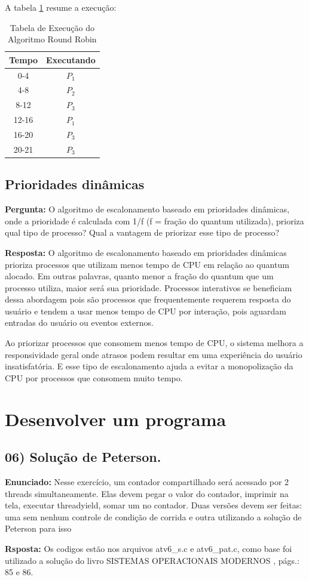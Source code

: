 \documentclass{article}
\begin{document}
A tabela \ref{tab:execRR} resume a execução:

\begin{table}[h]
    \centering
    \begin{tabular}{|c|c|}
        \hline
        \textbf{Tempo} & \textbf{Executando} \\
        \hline
        0-4   & \( P_1 \)  \\
        4-8   & \( P_2 \)  \\
        8-12  & \( P_3 \)  \\
        12-16 & \( P_1 \)  \\
        16-20 & \( P_3 \)  \\
        20-21 & \( P_3 \)  \\
        \hline
    \end{tabular}
    \caption{Tabela de Execução do Algoritmo Round Robin}
    \label{tab:execRR}
\end{table}

\subsection{Prioridades dinâmicas}
\textbf{Pergunta:} O algoritmo de escalonamento baseado em prioridades dinâmicas, onde a prioridade é calculada com 1/f (f = fração do quantum utilizada), prioriza qual tipo de processo? Qual a vantagem de priorizar esse tipo de processo?\newline

\textbf{Resposta:} O algoritmo de escalonamento baseado em prioridades dinâmicas prioriza processos que utilizam menos tempo de CPU em relação ao quantum alocado. Em outras palavras, quanto menor a fração do quantum que um processo utiliza, maior será sua prioridade. Processos interativos se beneficiam dessa abordagem pois são processos que frequentemente requerem resposta do usuário e tendem a usar menos tempo de CPU por interação, pois aguardam entradas do usuário ou eventos externos. 

Ao priorizar processos que consomem menos tempo de CPU, o sistema melhora a responsividade geral onde atrasos podem resultar em uma experiência do usuário insatisfatória. E esse tipo de escalonamento ajuda a evitar a monopolização da CPU por processos que consomem muito tempo. 

\section{Desenvolver um programa}
\subsection{06) Solução de Peterson.}
\textbf{Enunciado:} Nesse exercício, um contador compartilhado será acessado por 2 threads simultaneamente. Elas devem pegar o valor do contador, imprimir na tela, executar threadyield, somar um no contador. Duas versões devem ser feitas: uma sem nenhum controle de condição de corrida e outra utilizando a solução de Peterson para isso\newline

\textbf{Rsposta:} Os codigos estão nos arquivos atv6\_s.c e atv6\_pat.c, como base foi utilizado a solução do livro SISTEMAS OPERACIONAIS MODERNOS \cite{tanenbaum2021}, págs.: 85 e 86.

\printbibliography %
\end{document}
